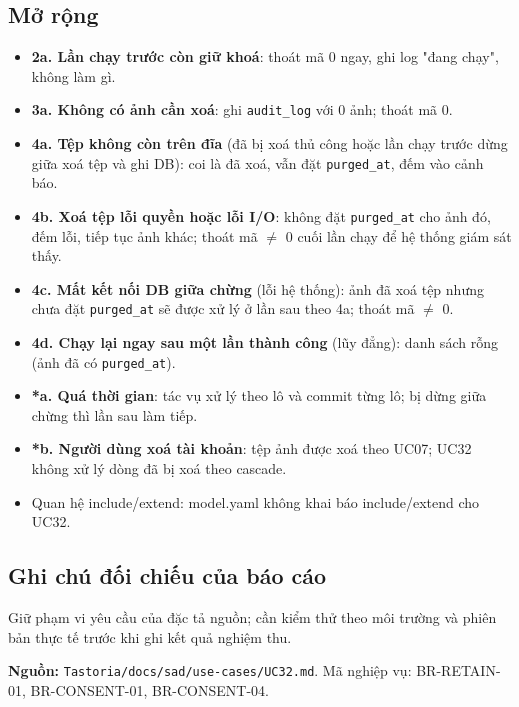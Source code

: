 \subsection{Mở rộng}
\begin{itemize}
\item \textbf{2a. Lần chạy trước còn giữ khoá}: thoát mã 0 ngay, ghi log "đang chạy", không làm gì.
\item \textbf{3a. Không có ảnh cần xoá}: ghi {\small\texttt{audit\_\allowbreak{}\allowbreak{}log}} với 0 ảnh; thoát mã 0.
\item \textbf{4a. Tệp không còn trên đĩa} (đã bị xoá thủ công hoặc lần chạy trước dừng giữa xoá tệp và ghi DB): coi là đã xoá, vẫn đặt {\small\texttt{purged\_\allowbreak{}\allowbreak{}at}}, đếm vào cảnh báo.
\item \textbf{4b. Xoá tệp lỗi quyền hoặc lỗi I/\allowbreak{}O}: không đặt {\small\texttt{purged\_\allowbreak{}\allowbreak{}at}} cho ảnh đó, đếm lỗi, tiếp tục ảnh khác; thoát mã \ensuremath{\neq} 0 cuối lần chạy để hệ thống giám sát thấy.
\item \textbf{4c. Mất kết nối DB giữa chừng} (lỗi hệ thống): ảnh đã xoá tệp nhưng chưa đặt {\small\texttt{purged\_\allowbreak{}\allowbreak{}at}} sẽ được xử lý ở lần sau theo 4a; thoát mã \ensuremath{\neq} 0.
\item \textbf{4d. Chạy lại ngay sau một lần thành công} (lũy đẳng): danh sách rỗng (ảnh đã có {\small\texttt{purged\_\allowbreak{}\allowbreak{}at}}).
\item \textbf{*a. Quá thời gian}: tác vụ xử lý theo lô và commit từng lô; bị dừng giữa chừng thì lần sau làm tiếp.
\item \textbf{*b. Người dùng xoá tài khoản}: tệp ảnh được xoá theo UC07; UC32 không xử lý dòng đã bị xoá theo cascade.
\item Quan hệ include/\allowbreak{}extend: model.yaml không khai báo include/\allowbreak{}extend cho UC32.
\end{itemize}
\subsection{Ghi chú đối chiếu của báo cáo}
Giữ phạm vi yêu cầu của đặc tả nguồn; cần kiểm thử theo môi trường và phiên bản thực tế trước khi ghi kết quả nghiệm thu.

\textbf{Nguồn:} {\small\texttt{Tastoria/\allowbreak{}\allowbreak{}docs/\allowbreak{}\allowbreak{}sad/\allowbreak{}\allowbreak{}use-\allowbreak{}cases/\allowbreak{}\allowbreak{}UC32.\allowbreak{}md}}. Mã nghiệp vụ: BR-\allowbreak{}RETAIN-\allowbreak{}01, BR-\allowbreak{}CONSENT-\allowbreak{}01, BR-\allowbreak{}CONSENT-\allowbreak{}04.

